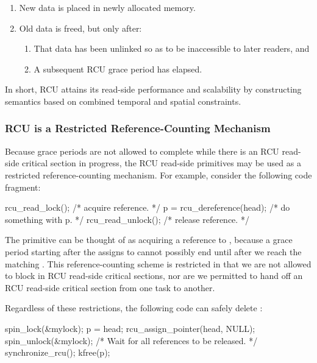 \begin{enumerate}
\item	New data is placed in newly allocated memory.
\item	Old data is freed, but only after:
	\begin{enumerate}
	\item	That data has been unlinked so as to be inaccessible
		to later readers, and
	\item	A subsequent RCU grace period has elapsed.
	\end{enumerate}
\end{enumerate}

In short, RCU attains its read-side performance and scalability by
constructing semantics based on combined temporal and spatial constraints.

\subsubsection{RCU is a Restricted Reference-Counting Mechanism}
\label{sec:defer:RCU is a Restricted Reference-Counting Mechanism}

Because grace periods are not allowed to complete while
there is an RCU read-side critical section in progress,
the RCU read-side primitives may be used as a restricted
reference-counting mechanism.
For example, consider the following code fragment:

\begin{VerbatimN}
rcu_read_lock();  /* acquire reference. */
p = rcu_dereference(head);
/* do something with p. */
rcu_read_unlock();  /* release reference. */
\end{VerbatimN}

The  primitive can be thought of as
acquiring a reference to , because a grace period
starting after the  assigns to 
cannot possibly end until after we reach the matching
.
This reference-counting scheme is restricted in that
we are not allowed to block in RCU read-side critical sections,
nor are we permitted to hand off an RCU read-side critical section
from one task to another.

Regardless of these restrictions,
the following code can safely delete :

\begin{VerbatimN}
spin_lock(&mylock);
p = head;
rcu_assign_pointer(head, NULL);
spin_unlock(&mylock);
/* Wait for all references to be released. */
synchronize_rcu();
kfree(p);
\end{VerbatimN}

